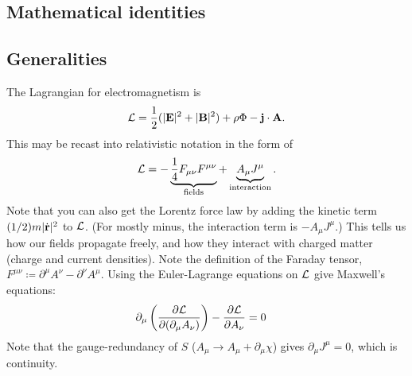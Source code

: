 \documentclass[11pt]{article}
\begin{document}
\subsection{Mathematical identities}


\subsection{Generalities}

The Lagrangian for electromagnetism is
\begin{align*}
    \mathcal{L} = \frac{1}{2} (|\mathbf{E}|^2 + |\mathbf{B}|^2) + \rho \Phi - \mathbf{j} \cdot \mathbf{A}.
\end{align*}
This may be recast into relativistic notation in the form of
\begin{align*}
    \mathcal{L} = - \underbrace{\frac{1}{4} F_{\mu \nu} F^{\mu \nu}}_{\rm fields} + \underbrace{A_{\mu} J^{\mu}}_{\rm interaction}.
\end{align*}
Note that you can also get the Lorentz force law by adding
the kinetic term $(1/2)m|\dot{\mathbf{r}}|^2$ to $\mathcal{L}$.
(For mostly minus, the interaction term is $- A_{\mu} J^\mu$.)
This tells us how our fields propagate freely, and how they interact
with charged matter (charge and current densities). Note the definition
of the Faraday tensor, $F^{\mu \nu} \coloneqq \partial^\mu A^\nu - \partial^\nu A^\mu$.
Using the Euler-Lagrange equations on $\mathcal{L}$ give Maxwell's equations:
\begin{align*}
    \partial_\mu \left( \frac{\partial \mathcal{L}}{\partial (\partial_\mu A_\nu)} \right) - \frac{\partial \mathcal{L}}{\partial A_\nu} & = 0
\end{align*}
Note that the gauge-redundancy of $S$ ($A_\mu \to A_\mu + \partial_\mu \chi$)
gives $\partial_\mu J^\mu = 0$, which is continuity.
\end{document}
